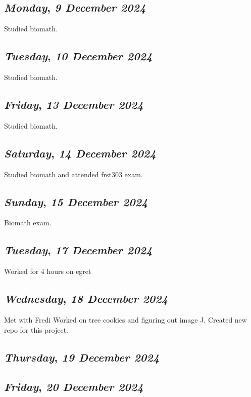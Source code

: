 \def\day{\textit{9 December 2024}}
\def\weekday{\textit{Monday}}
\subsection*{\weekday, \day}
Studied biomath.

\def\day{\textit{10 December 2024}}
\def\weekday{\textit{Tuesday}}
\subsection*{\weekday, \day}
Studied biomath.

\def\day{\textit{13 December 2024}}
\def\weekday{\textit{Friday}}
\subsection*{\weekday, \day}
Studied biomath.
\def\day{\textit{14 December 2024}}
\def\weekday{\textit{Saturday}}
\subsection*{\weekday, \day}
Studied biomath and attended frst303 exam.

\def\day{\textit{15 December 2024}}
\def\weekday{\textit{Sunday}}
\subsection*{\weekday, \day}
Biomath exam.

\def\day{\textit{17 December 2024}}
\def\weekday{\textit{Tuesday}}
\subsection*{\weekday, \day}
Worked for 4 hours on egret 

\def\day{\textit{18 December 2024}}
\def\weekday{\textit{Wednesday}}
\subsection*{\weekday, \day}
Met with Fredi Worked on tree cookies and figuring out image J. Created new repo for this project.
\def\day{\textit{19 December 2024}}
\def\weekday{\textit{Thursday}}
\subsection*{\weekday, \day}

\def\day{\textit{20 December 2024}}
\def\weekday{\textit{Friday}}
\subsection*{\weekday, \day}

